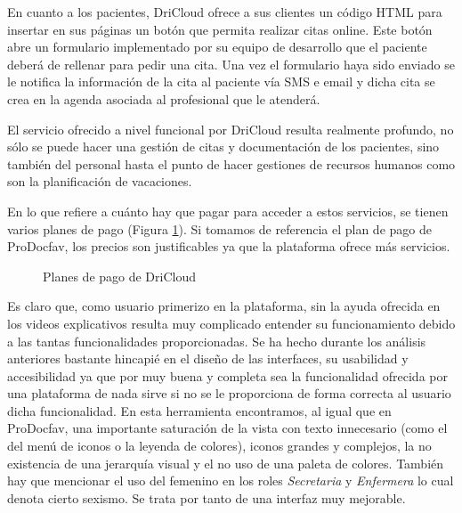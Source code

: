 En cuanto a los pacientes, DriCloud ofrece a sus clientes un código HTML para insertar en sus páginas un botón que permita realizar citas online. Este botón abre un formulario implementado por su equipo de desarrollo que el paciente deberá de rellenar para pedir una cita. Una vez el formulario haya sido enviado se le notifica la información de la cita al paciente vía SMS e email y dicha cita se crea en la agenda asociada al profesional que le atenderá. \bigskip

El servicio ofrecido a nivel funcional por DriCloud resulta realmente profundo, no sólo se puede hacer una gestión de citas y documentación de los pacientes, sino también del personal hasta el punto de hacer gestiones de recursos humanos como son la planificación de vacaciones. \bigskip

En lo que refiere a cuánto hay que pagar para acceder a estos servicios, se tienen varios planes de pago (Figura \ref{fig:dricloud-precios}). Si tomamos de referencia el plan de pago de ProDocfav, los precios son justificables ya que la plataforma ofrece más servicios. \bigskip

\begin{figure}[H]
    \caption{Planes de pago de DriCloud}
    \label{fig:dricloud-precios}
\end{figure}

Es claro que, como usuario primerizo en la plataforma, sin la ayuda ofrecida en los videos explicativos resulta muy complicado entender su funcionamiento debido a las tantas funcionalidades proporcionadas. Se ha hecho durante los análisis anteriores bastante hincapié en el diseño de las interfaces, su usabilidad y accesibilidad ya que por muy buena y completa sea la funcionalidad ofrecida por una plataforma de nada sirve si no se le proporciona de forma correcta al usuario dicha funcionalidad. En esta herramienta encontramos, al igual que en ProDocfav, una importante saturación de la vista con texto innecesario (como el del menú de iconos o la leyenda de colores), iconos grandes y complejos, la no existencia de una jerarquía visual y el no uso de una paleta de colores. También hay que mencionar el uso del femenino en los roles \textit{Secretaria} y \textit{Enfermera} lo cual denota cierto sexismo. Se trata por tanto de una interfaz muy mejorable. \bigskip

